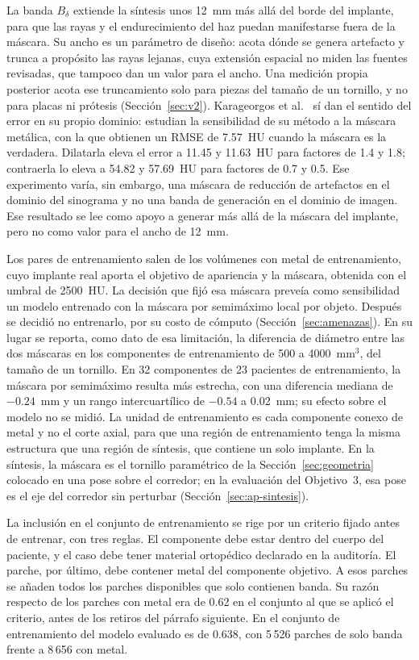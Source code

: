 La banda $B_{\delta}$ extiende la síntesis unos 12~mm más allá del borde del implante, para que las rayas y el endurecimiento del haz puedan manifestarse fuera de la máscara. Su ancho es un parámetro de diseño: acota dónde se genera artefacto y trunca a propósito las rayas lejanas, cuya extensión espacial no miden las fuentes revisadas, que tampoco dan un valor para el ancho. Una medición propia posterior acota ese truncamiento solo para piezas del tamaño de un tornillo, y no para placas ni prótesis (Sección~\ref{sec:v2}). Karageorgos et al.~\cite{karageorgos2024ddpm} sí dan el sentido del error en su propio dominio: estudian la sensibilidad de su método a la máscara metálica, con la que obtienen un RMSE de 7.57~HU cuando la máscara es la verdadera. Dilatarla eleva el error a 11.45 y 11.63~HU para factores de 1.4 y 1.8; contraerla lo eleva a 54.82 y 57.69~HU para factores de 0.7 y 0.5. Ese experimento varía, sin embargo, una máscara de reducción de artefactos en el dominio del sinograma y no una banda de generación en el dominio de imagen. Ese resultado se lee como apoyo a generar más allá de la máscara del implante, pero no como valor para el ancho de 12~mm.

Los pares de entrenamiento salen de los volúmenes con metal de entrenamiento, cuyo implante real aporta el objetivo de apariencia y la máscara, obtenida con el umbral de 2500~HU. La decisión que fijó esa máscara preveía como sensibilidad un modelo entrenado con la máscara por semimáximo local por objeto. Después se decidió no entrenarlo, por su costo de cómputo (Sección~\ref{sec:amenazas}). En su lugar se reporta, como dato de esa limitación, la diferencia de diámetro entre las dos máscaras en los componentes de entrenamiento de 500 a 4000~mm$^3$, del tamaño de un tornillo. En 32 componentes de 23 pacientes de entrenamiento, la máscara por semimáximo resulta más estrecha, con una diferencia mediana de $-0.24$~mm y un rango intercuartílico de $-0.54$ a 0.02~mm; su efecto sobre el modelo no se midió. La unidad de entrenamiento es cada componente conexo de metal y no el corte axial, para que una región de entrenamiento tenga la misma estructura que una región de síntesis, que contiene un solo implante. En la síntesis, la máscara es el tornillo paramétrico de la Sección~\ref{sec:geometria} colocado en una pose sobre el corredor; en la evaluación del Objetivo~3, esa pose es el eje del corredor sin perturbar (Sección~\ref{sec:ap-sintesis}).

La inclusión en el conjunto de entrenamiento se rige por un criterio fijado antes de entrenar, con tres reglas. El componente debe estar dentro del cuerpo del paciente, y el caso debe tener material ortopédico declarado en la auditoría. El parche, por último, debe contener metal del componente objetivo. A esos parches se añaden todos los parches disponibles que solo contienen banda. Su razón respecto de los parches con metal era de 0.62 en el conjunto al que se aplicó el criterio, antes de los retiros del párrafo siguiente. En el conjunto de entrenamiento del modelo evaluado es de 0.638, con 5\,526 parches de solo banda frente a 8\,656 con metal.

